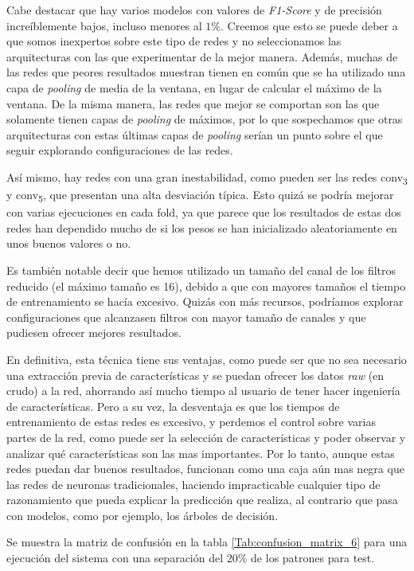 \documentclass[12pt]{article}
\begin{document}
\bigskip
Cabe destacar que hay varios modelos con valores de \textit{F1-Score} y de precisión increíblemente bajos,
incluso menores al $1\%$. Creemos que esto se puede deber a que somos inexpertos sobre este tipo de redes
y no seleccionamos las arquitecturas con las que experimentar de la mejor manera. Además, muchas de las
redes que peores resultados muestran tienen en común que se ha utilizado una capa de \textit{pooling} de media
de la ventana, en lugar de calcular el máximo de la ventana. De la misma manera, las redes que mejor se comportan
son las que solamente tienen capas de \textit{pooling} de máximos, por lo que sospechamos que otras arquitecturas
con estas últimas capas de \textit{pooling} serían un punto sobre el que seguir explorando configuraciones de las redes.

\bigskip
Así mismo, hay redes con una gran inestabilidad, como pueden ser las redes conv\textsubscript{3} y
conv\textsubscript{5}, que presentan una alta desviación típica. Esto quizá se podría mejorar con
varias ejecuciones en cada fold, ya que parece que los resultados de estas dos redes han dependido
mucho de si los pesos se han inicializado aleatoriamente en unos buenos valores o no.

\bigskip
Es también notable decir que hemos utilizado un tamaño del canal de los filtros reducido (el máximo tamaño es 16),
debido a que con mayores tamaños el tiempo de entrenamiento se hacía excesivo. Quizás con más recursos,
podríamos explorar configuraciones que alcanzasen filtros con mayor tamaño de canales y que pudiesen
ofrecer mejores resultados.

\bigskip
En definitiva, esta técnica tiene sus ventajas, como puede ser que no sea necesario una extracción previa
de características y se puedan ofrecer los datos \textit{raw} (en crudo) a la red, ahorrando así mucho tiempo
al usuario de tener hacer ingeniería de características. Pero a su vez, la desventaja es que los tiempos de entrenamiento
de estas redes es excesivo, y perdemos el control sobre varias partes de la red, como puede ser la selección de
características y poder observar y analizar qué características son las mas importantes. Por lo tanto,
aunque estas redes puedan dar buenos resultados, funcionan como una caja aún mas negra que las redes de neuronas
tradicionales, haciendo impracticable cualquier tipo de razonamiento que pueda explicar la predicción que realiza,
al contrario que pasa con modelos, como por ejemplo, los árboles de decisión.

\bigskip
Se muestra la matriz de confusión en la tabla \ref{Tab:confusion_matrix_6} para una ejecución del sistema
con una separación del $20\%$ de los patrones para test.
\end{document}
